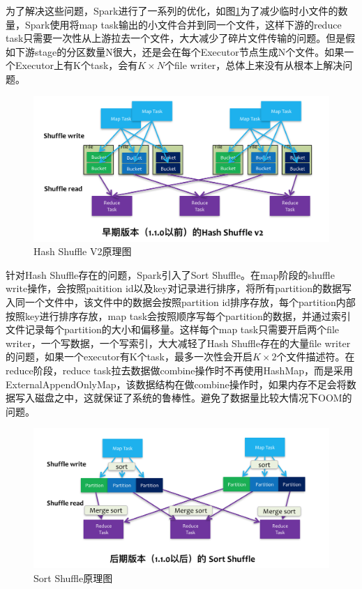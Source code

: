 为了解决这些问题，Spark进行了一系列的优化，如图\ref{fig:shuffle-v2}为了减少临时小文件的数量，Spark使用将map task输出的小文件合并到同一个文件，这样下游的reduce task只需要一次性从上游拉去一个文件，大大减少了碎片文件传输的问题。但是假如下游stage的分区数量N很大，还是会在每个Executor节点生成N个文件。如果一个Executor上有K个task，会有$K \times N$个file writer，总体上来没有从根本上解决问题。


\begin{figure}[htbp]
    \centering
    \includegraphics[width=1\textwidth]{Img/spark-shuffle-v2.png}
    \caption{Hash Shuffle V2原理图}
    \label{fig:shuffle-v2}
\end{figure}


针对Hash Shuffle存在的问题，Spark引入了Sort Shuffle。在map阶段的shuffle write操作，会按照paitition id以及key对记录进行排序，将所有partition的数据写入同一个文件中，该文件中的数据会按照partition id排序存放，每个partition内部按照key进行排序存放，map task会按照顺序写每个partition的数据，并通过索引文件记录每个partition的大小和偏移量。这样每个map task只需要开启两个file writer，一个写数据，一个写索引，大大减轻了Hash Shuffle存在的大量file writer的问题，如果一个executor有K个task，最多一次性会开启$K \times 2$个文件描述符。在reduce阶段，reduce task拉去数据做combine操作时不再使用HashMap，而是采用ExternalAppendOnlyMap，该数据结构在做combine操作时，如果内存不足会将数据写入磁盘之中，这就保证了系统的鲁棒性。避免了数据量比较大情况下OOM的问题。


\begin{figure}[htbp]
    \centering
    \includegraphics[width=1\textwidth]{Img/sort-shuffle.png}
    \caption{Sort Shuffle原理图}
    \label{fig:sort-shuffle}
\end{figure}


